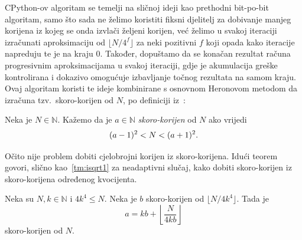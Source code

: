 \documentclass[12pt]{scrartcl}
\begin{document}
CPython-ov algoritam se temelji na sličnoj ideji kao prethodni bit-po-bit algoritam, samo što sada ne želimo koristiti fiksni djelitelj
za dobivanje manjeg korijena iz kojeg se onda izvlači željeni korijen, već želimo u svakoj iteraciji izračunati aproksimaciju od
$\lfloor N/4^f\rfloor$ za neki pozitivni $f$ koji opada kako iteracije napreduju te je na kraju $0$. Također, dopuštamo da se konačan
rezultat računa progresivnim aproksimacijama u svakoj iteraciji, gdje je akumulacija greške kontrolirana i dokazivo omogućuje izbavljanje
točnog rezultata na samom kraju. Ovaj algoritam 
koristi te ideje kombinirane s osnovnom Heronovom metodom da izračuna tzv.\ skoro-korijen od $N$, po definiciji iz~\cite{mdickpaper}:
\begin{definicija}
    Neka je $N\in\mathbb N$. Kažemo da je $a\in\mathbb N$ \emph{skoro-korijen} od $N$ ako vrijedi 
    \begin{equation*}
        (a-1)^2 < N < (a+1)^2\text.
    \end{equation*}
\end{definicija}
Očito nije problem dobiti cjelobrojni korijen iz skoro-korijena. Idući teorem govori, slično kao~\autoref{tm:isqrt1} za neadaptivni slučaj,
kako dobiti skoro-korijen iz skoro-korijena određenog kvocijenta.
\begin{teorem}
    Neka su $N,k\in\mathbb N$ i $4k^4 \leq N$. Neka je $b$ skoro-korijen od $\lfloor N/4k^4\rfloor$. Tada je 
    \begin{equation}
        a=kb+\left\lfloor\frac{N}{4kb}\right\rfloor
    \end{equation}
    skoro-korijen od $N$.
\end{teorem}
\end{document}
